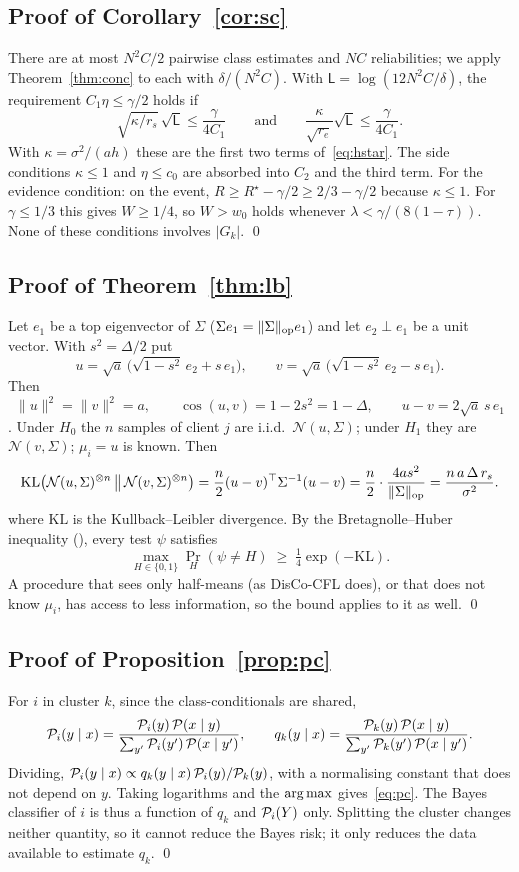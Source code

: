 \subsection{Proof of Corollary~\ref{cor:sc}}
There are at most $N^2C/2$ pairwise class estimates and $NC$ reliabilities; we apply Theorem~\ref{thm:conc} to each with $\delta/(N^2C)$. With $\mathsf L=\log(12N^2C/\delta)$, the requirement $C_1\eta\le\gamma/2$ holds if
\[
\sqrt{\kappa/r_s}\,\sqrt{\mathsf L}\le\frac{\gamma}{4C_1}
\qquad\text{and}\qquad
\frac{\kappa}{\sqrt{r_e}}\sqrt{\mathsf L}\le\frac{\gamma}{4C_1}.
\]
With $\kappa=\sigma^2/(ah)$ these are the first two terms of~\eqref{eq:hstar}. The side conditions $\kappa\le1$ and $\eta\le c_0$ are absorbed into $C_2$ and the third term. For the evidence condition: on the event, $R\ge R^\star-\gamma/2\ge2/3-\gamma/2$ because $\kappa\le1$. For $\gamma\le1/3$ this gives $W\ge1/4$, so $W>w_0$ holds whenever $\lambda<\gamma/(8(1-\tau))$. None of these conditions involves $|G_k|$. \qed

\subsection{Proof of Theorem~\ref{thm:lb}}
Let $e_1$ be a top eigenvector of $\Sigma$ ($\Sigma e_1=\|\Sigma\|_{\mathrm{op}} e_1$) and let $e_2\perp e_1$ be a unit vector. With $s^2=\Delta/2$ put
\[
u=\sqrt a\,\big(\sqrt{1-s^2}\,e_2+s\,e_1\big),
\qquad
v=\sqrt a\,\big(\sqrt{1-s^2}\,e_2-s\,e_1\big).
\]
Then
\[
\|u\|^2=\|v\|^2=a,\qquad \cos(u,v)=1-2s^2=1-\Delta,\qquad u-v=2\sqrt a\,s\,e_1
\]
. Under $H_0$ the $n$ samples of client $j$ are i.i.d.\ $\mathcal N(u,\Sigma)$; under $H_1$ they are $\mathcal N(v,\Sigma)$; $\mu_i=u$ is known. Then
\[
\mathrm{KL}\big(\mathcal N(u,\Sigma)^{\otimes n}\,\big\|\,\mathcal N(v,\Sigma)^{\otimes n}\big)
=\frac n2(u-v)^\top\Sigma^{-1}(u-v)
=\frac n2\cdot\frac{4as^2}{\|\Sigma\|_{\mathrm{op}}}
=\frac{n\,a\,\Delta\,r_s}{\sigma^2}.
\]
where $\mathrm{KL}$ is the Kullback--Leibler divergence. By the Bretagnolle--Huber inequality (\citealp[Thm.~2.2]{tsybakov2009}), every test $\psi$ satisfies
\[
\max_{H\in\{0,1\}}\Pr_H(\psi\neq H)\;\ge\;\tfrac14\exp(-\mathrm{KL}).
\]
A procedure that sees only half-means (as DisCo-CFL does), or that does not know $\mu_i$, has access to less information, so the bound applies to it as well. \qed

\subsection{Proof of Proposition~\ref{prop:pc}}
For $i$ in cluster $k$, since the class-conditionals are shared,
\[
\mathcal{P}_i(y\mid x)=\frac{\mathcal{P}_i(y)\,\mathcal{P}(x\mid y)}{\sum_{y'}\mathcal{P}_i(y')\,\mathcal{P}(x\mid y')},
\qquad
q_k(y\mid x)=\frac{\mathcal{P}_k(y)\,\mathcal{P}(x\mid y)}{\sum_{y'}\mathcal{P}_k(y')\,\mathcal{P}(x\mid y')}.
\]
Dividing, $\mathcal{P}_i(y\mid x)\propto q_k(y\mid x)\,\mathcal{P}_i(y)/\mathcal{P}_k(y)$, with a normalising constant that does not depend on $y$. Taking logarithms and the $\operatorname*{arg\,max}$ gives~\eqref{eq:pc}. The Bayes classifier of $i$ is thus a function of $q_k$ and $\mathcal{P}_i(Y)$ only. Splitting the cluster changes neither quantity, so it cannot reduce the Bayes risk; it only reduces the data available to estimate $q_k$. \qed


